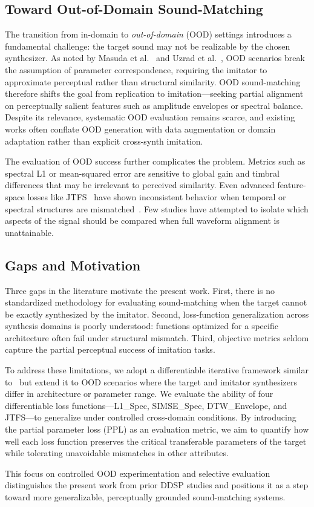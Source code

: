 \documentclass[runningheads,20pt]{llncs}
\begin{document}
\subsection{Toward Out-of-Domain Sound-Matching}
The transition from in-domain to \emph{out-of-domain} (OOD) settings introduces a fundamental challenge: the target sound may not be realizable by the chosen synthesizer.  
As noted by Masuda et al.~\cite{masuda2021synthesizer} and Uzrad et al.~\cite{uzrad2024diffmoog}, OOD scenarios break the assumption of parameter correspondence, requiring the imitator to approximate perceptual rather than structural similarity.  
OOD sound-matching therefore shifts the goal from replication to imitation—seeking partial alignment on perceptually salient features such as amplitude envelopes or spectral balance.  
Despite its relevance, systematic OOD evaluation remains scarce, and existing works often conflate OOD generation with data augmentation or domain adaptation rather than explicit cross-synth imitation.

The evaluation of OOD success further complicates the problem.  
Metrics such as spectral L1 or mean-squared error are sensitive to global gain and timbral differences that may be irrelevant to perceived similarity.  
Even advanced feature-space losses like JTFS~\cite{vahidi2023mesostructures} have shown inconsistent behavior when temporal or spectral structures are mismatched~\cite{salimi2025soundmatching}.  
Few studies have attempted to isolate which aspects of the signal should be compared when full waveform alignment is unattainable.

\subsection{Gaps and Motivation}
Three gaps in the literature motivate the present work.  
First, there is no standardized methodology for evaluating sound-matching when the target cannot be exactly synthesized by the imitator.  
Second, loss-function generalization across synthesis domains is poorly understood: functions optimized for a specific architecture often fail under structural mismatch.  
Third, objective metrics seldom capture the partial perceptual success of imitation tasks.

To address these limitations, we adopt a differentiable iterative framework similar to~\cite{salimi2025soundmatching} but extend it to OOD scenarios where the target and imitator synthesizers differ in architecture or parameter range.  
We evaluate the ability of four differentiable loss functions—L1\_Spec, SIMSE\_Spec, DTW\_Envelope, and JTFS—to generalize under controlled cross-domain conditions.  
By introducing the partial parameter loss (PPL) as an evaluation metric, we aim to quantify how well each loss function preserves the critical transferable parameters of the target while tolerating unavoidable mismatches in other attributes.

This focus on controlled OOD experimentation and selective evaluation distinguishes the present work from prior DDSP studies and positions it as a step toward more generalizable, perceptually grounded sound-matching systems.




\end{document}
